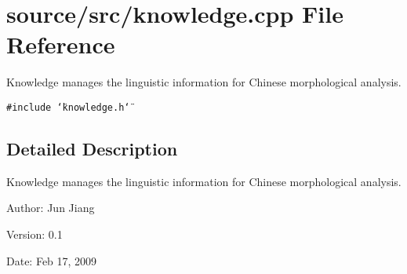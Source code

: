 \section{source/src/knowledge.cpp File Reference}
\label{knowledge_8cpp}
Knowledge manages the linguistic information for Chinese morphological analysis.  


{\tt \#include \char`\"{}knowledge.h\char`\"{}}\par


\subsection{Detailed Description}
Knowledge manages the linguistic information for Chinese morphological analysis. 

\begin{Desc}
\item[Author:]Jun Jiang \end{Desc}
\begin{Desc}
\item[Version:]0.1 \end{Desc}
\begin{Desc}
\item[Date:]Feb 17, 2009 \end{Desc}
